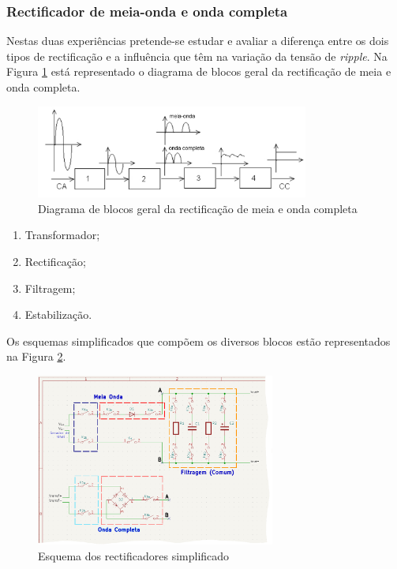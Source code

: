 \subsubsection{Rectificador de meia-onda e onda completa}
\label{sec:rectificadores}

Nestas duas experiências pretende-se estudar e avaliar a diferença entre os dois tipos de rectificação e a influência que têm na variação da tensão de \textit{ripple}. Na Figura \ref{fig:blocosrectificacao} está representado o diagrama de blocos geral da rectificação de meia e onda completa. 

\begin{figure}[hbtp]
	\centering
	\includegraphics[width=0.8\textwidth]{figures/diagramablocosrectificacao.png}
	\caption{Diagrama de blocos geral da rectificação de meia e onda completa}
	\label{fig:blocosrectificacao}
\end{figure}

\begin{enumerate}
	\item Transformador;
	\item Rectificação;
	\item Filtragem;
	\item Estabilização.
\end{enumerate}

Os esquemas simplificados que compõem os diversos blocos estão representados na Figura \ref{fig:rectificadoresimplificado}.

\begin{figure}[hbtp]
	\centering
	\includegraphics[width=0.7\textwidth]{figures/MeiaOndaSimplificado.png}
	\caption{Esquema dos rectificadores simplificado}
	\label{fig:rectificadoresimplificado}
\end{figure}

